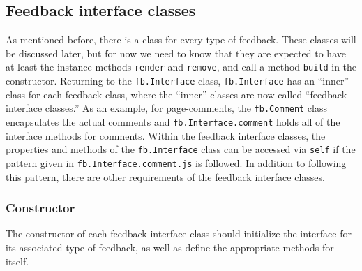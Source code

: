 \documentclass[letterpaper,12pt]{article}
\newcommand{\fb}[1]{\texttt{fb#1}}
\newcommand{\code}[1]{{\tt #1}}
\begin{document}
\subsection{Feedback interface classes}
\label{sec:fb.Interface:interface classes}
As mentioned before, there is a class for every type of feedback.  These classes will be discussed later, but for now we need to know that they are expected to have at least the instance methods \code{render} and \code{remove}, and call a method \code{build} in the constructor.  Returning to the \fb{.Interface} class, \fb{.Interface} has an ``inner'' class for each feedback class, where the ``inner'' classes are now called ``feedback interface classes.''  As an example, for page-comments, the \fb{.Comment} class encapsulates the actual comments and \fb{.Interface.comment} holds all of the interface methods for comments.  Within the feedback interface classes, the properties and methods of the \fb{.Interface} class can be accessed via \code{self} if the pattern given in \code{fb.Interface.comment.js} is followed.  In addition to following this pattern, there are other requirements of the feedback interface classes.

\subsubsection{Constructor}
\label{sec:fb.Interface:interface classes:constructor}
The constructor of each feedback interface class should initialize the interface for its associated type of feedback, as well as define the appropriate methods for itself.
\end{document}
